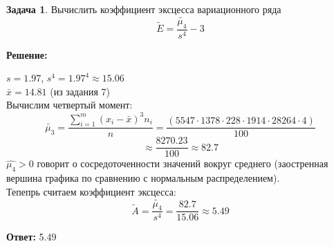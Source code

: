 \documentclass[a4paper,12pt]{article}
\theoremstyle{definition}
\newtheorem{problem}{Задача}\setlength{\parindent}{0pt}
\newenvironment{solution}
{\begin{shaded}\textbf{Решение:}\par\setlength{\parindent}{0pt}}
{\end{shaded}}
\newenvironment{answer}
{\par\noindent\textbf{Ответ:} }
{\par}
\begin{document}
\vspace{8pt}
\begin{problem}
    Вычислить коэффициент эксцесса вариационного ряда
    \[\tilde{E} = \frac{\tilde{\mu_4}}{s^4} - 3\]
    
        \begin{solution}
            \(s = 1.97\), \( s^4 = 1.97^4 \approx 15.06 \)\\
        \(\bar{x} = 14.81\) (из задания 7)\\

        Вычислим четвертый момент:
        \[ \tilde{\mu_3} = \frac{\sum^m_{i=1}(x_i - \bar{x})^3 n_i}{n} = 
        \frac{(     5547\cdot1
                    378\cdot2
                    28\cdot19
                    14\cdot28
                    264\cdot4
                     )}{100} \]
            \[ \approx \frac{8270.23}{100} \approx 82.7 \]
        \(\hat{\mu_4} > 0\) говорит о сосредоточенности значений вокруг среднего 
        (заостренная вершина графика по сравнению с нормальным распределением). \\
        
        Тепепрь считаем коэффициент эксцесса:
        \[ \tilde{A} = \frac{\tilde{\mu_4}}{s^4} = \frac{82.7}{15.06} \approx 5.49\]

        \end{solution}
    
        \begin{answer}
            5.49
        \end{answer}
    
    \end{problem}
\end{document}
